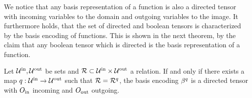 We notice that any basis representation of a function is also a directed tensor with incoming variables to the domain and outgoing variables to the image.
It furthermore holds, that the set of directed and boolean tensors is characterized by the basis encoding of functions.
This is shown in the next theorem, by the claim that any boolean tensor which is directed is the basis representation of a function.

\begin{theorem}
    \label{the:bencodingDirected}
    Let $\mathcal{U}^{\mathrm{in}},\mathcal{U}^{\mathrm{out}}$ be sets and $\mathcal{R}\subset\mathcal{U}^{\mathrm{in}}\times\mathcal{U}^{\mathrm{out}}$ a relation.
    If and only if there exists a map $q:\mathcal{U}^{\mathrm{in}}\rightarrow\mathcal{U}^{\mathrm{out}}$ such that $\mathcal{R}=\mathcal{R}^{q}$, the basis encoding $\beta^{q}$ is a directed tensor with $O_{\mathrm{in}}$ incoming and $O_{\mathrm{out}}$ outgoing.
\end{theorem}
